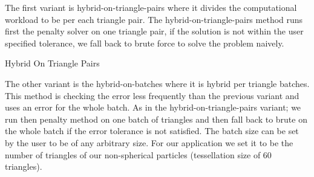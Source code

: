 The first variant is hybrid-on-triangle-pairs where it divides the computational workload to be per each triangle pair. The hybrid-on-triangle-pairs method runs first the penalty solver on one triangle pair, if the solution is not within the user specified tolerance, we fall back to brute force to solve the problem naively. 

\begin{algorithm}
 \caption{Hybrid On Triangle Pairs} \label{algorithm:hybridTriangle}
 \begin{algorithmic}[1]

	
	
			


	
				\EndIf
	
			\EndFor
			
		\EndFor
		
	
	\EndFunction
	
 \end{algorithmic}
\end{algorithm} 

The other variant is the hybrid-on-batches where it is hybrid per triangle batches. This method is checking the error less frequently than the previous variant and uses an error for the whole batch. As in the hybrid-on-triangle-pairs variant; we run then penalty method on one batch of triangles and then fall back to brute on the whole batch if the error tolerance is not satisfied. The batch size can be set by the user to be of any arbitrary size. For our application we set it to be the number of triangles of our non-spherical particles (tessellation size of 60~ triangles).    

